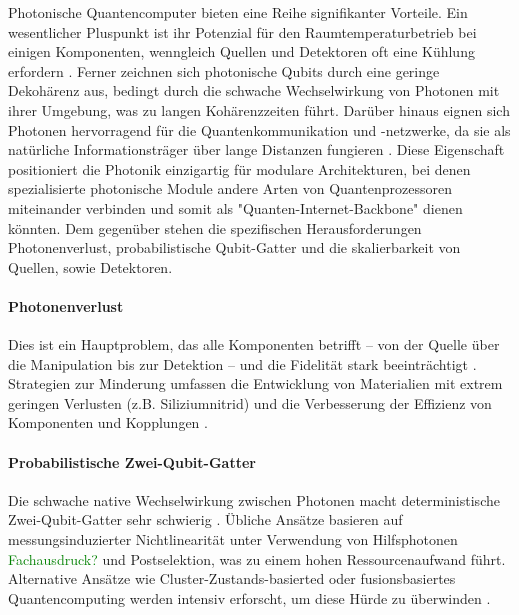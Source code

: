 Photonische Quantencomputer bieten eine Reihe signifikanter Vorteile. Ein wesentlicher Pluspunkt ist ihr Potenzial für den Raumtemperaturbetrieb bei einigen Komponenten, wenngleich Quellen und Detektoren oft eine Kühlung erfordern \cite{abughanemPhotonicQuantumComputers2024}. Ferner zeichnen sich photonische Qubits durch eine geringe Dekohärenz aus, bedingt durch die schwache Wechselwirkung von Photonen mit ihrer Umgebung, was zu langen Kohärenzzeiten führt\cite{abughanemPhotonicQuantumComputers2024}. Darüber hinaus eignen sich Photonen hervorragend für die Quantenkommunikation und -netzwerke, da sie als natürliche Informationsträger über lange Distanzen fungieren \cite{abughanemPhotonicQuantumComputers2024}. Diese Eigenschaft positioniert die Photonik einzigartig für modulare Architekturen, bei denen spezialisierte photonische Module andere Arten von Quantenprozessoren miteinander verbinden und somit als "Quanten-Internet-Backbone" dienen könnten.
\newline
\newline
Dem gegenüber stehen die spezifischen Herausforderungen Photonenverlust, probabilistische Qubit-Gatter und die skalierbarkeit von Quellen, sowie Detektoren.
\paragraph{Photonenverlust}
Dies ist ein Hauptproblem, das alle Komponenten betrifft – von der Quelle über die Manipulation bis zur Detektion – und die Fidelität stark beeinträchtigt \cite{LinearOpticsScalable}. Strategien zur Minderung umfassen die Entwicklung von Materialien mit extrem geringen Verlusten (z.B. Siliziumnitrid) und die Verbesserung der Effizienz von Komponenten und Kopplungen \cite{salavrakosPhotonnativeQuantumAlgorithms2025}.

\paragraph{Probabilistische Zwei-Qubit-Gatter}
Die schwache native Wechselwirkung zwischen Photonen macht deterministische Zwei-Qubit-Gatter sehr schwierig \cite{slussarenkoPhotonicQuantumInformation2019}. Übliche Ansätze basieren auf messungsinduzierter Nichtlinearität unter Verwendung von Hilfsphotonen \textcolor{green}{Fachausdruck?} und Postselektion, was zu einem hohen Ressourcenaufwand führt. Alternative Ansätze wie Cluster-Zustands-basierted oder fusionsbasiertes Quantencomputing werden intensiv erforscht, um diese Hürde zu überwinden \cite{salavrakosPhotonnativeQuantumAlgorithms2025}.

